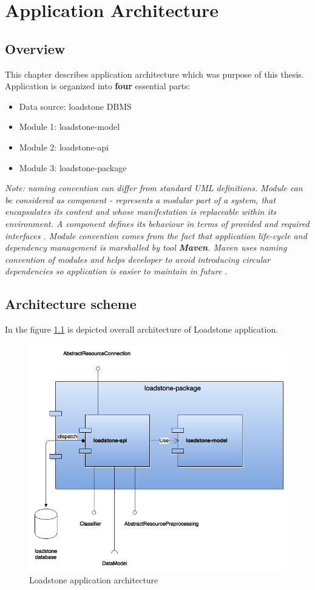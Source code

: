 \chapter{Application Architecture}
\section{Overview}
This chapter describes application architecture which was purpose of this thesis. Application is organized into \textbf{four} essential parts:
\begin{itemize}
	\item Data source: loadstone DBMS
	\item Module 1: loadstone-model
	\item Module 2: loadstone-api
	\item Module 3: loadstone-package
\end{itemize}

\textit{Note: naming convention can differ from standard UML definitions. Module can be considered as component - represents a modular part of a system, that encapsulates its content and whose manifestation is replaceable within its environment. A component defines its behaviour in terms of provided and required interfaces \cite{22}. Module convention comes from the fact that application life-cycle and dependency management is marshalled by tool \textbf{Maven}. Maven uses naming convention of modules and helps developer to avoid introducing circular dependencies so application is easier to maintain in future} \cite{23}.

\section{Architecture scheme}
In the figure \ref{fig:@=architecture} is depicted overall architecture of Loadstone application.
\begin{figure}
	\centering
	\includegraphics[scale=0.6]{architecture.png}
	\caption{Loadstone application architecture}
	\label{fig:@=architecture}
\end{figure}

